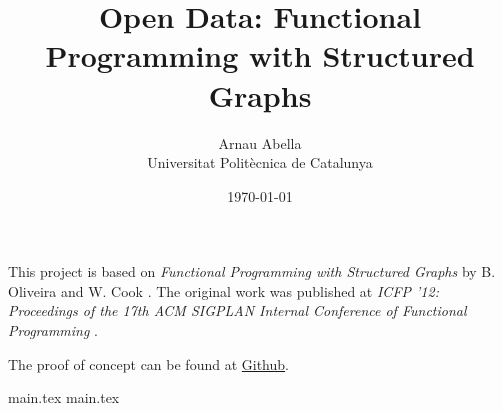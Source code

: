 \documentclass[12pt, a4paper]{article}
\title{%
  \vspace{-10ex}
  Open Data: Functional Programming with Structured Graphs
}
\author{%
  Arnau Abella \\
  \large{Universitat Polit\`ecnica de Catalunya}
}
\date{\today}
\begin{document}
\maketitle

This project is based on \textit{Functional Programming with Structured Graphs} by B. Oliveira and W. Cook \cite{oliveira2012functional}. The original work was published at \textit{ICFP '12: Proceedings of the 17th ACM SIGPLAN Internal Conference of Functional Programming} \cite{icfp12}.

The proof of concept can be found at \href{https://github.com/monadplus/od-final-project}{Github}.

{main.tex}
{main.tex}



\end{document}
